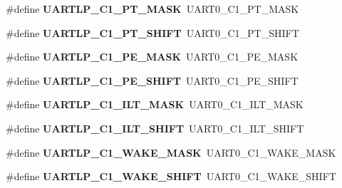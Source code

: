 \begin{DoxyCompactItemize}
\#define {\bfseries U\+A\+R\+T\+L\+P\+\_\+\+C1\+\_\+\+P\+T\+\_\+\+M\+A\+SK}~U\+A\+R\+T0\+\_\+\+C1\+\_\+\+P\+T\+\_\+\+M\+A\+SK
\item 
\mbox{\label{group___backward___compatibility___symbols_ga97ce472c10fd61704932180dc3e26d51}} 
\#define {\bfseries U\+A\+R\+T\+L\+P\+\_\+\+C1\+\_\+\+P\+T\+\_\+\+S\+H\+I\+FT}~U\+A\+R\+T0\+\_\+\+C1\+\_\+\+P\+T\+\_\+\+S\+H\+I\+FT
\item 
\mbox{\label{group___backward___compatibility___symbols_ga23f4f361b83573abfc5cfd6f15ef3a89}} 
\#define {\bfseries U\+A\+R\+T\+L\+P\+\_\+\+C1\+\_\+\+P\+E\+\_\+\+M\+A\+SK}~U\+A\+R\+T0\+\_\+\+C1\+\_\+\+P\+E\+\_\+\+M\+A\+SK
\item 
\mbox{\label{group___backward___compatibility___symbols_gacce781ed7eeeb5e51a145dfec1848406}} 
\#define {\bfseries U\+A\+R\+T\+L\+P\+\_\+\+C1\+\_\+\+P\+E\+\_\+\+S\+H\+I\+FT}~U\+A\+R\+T0\+\_\+\+C1\+\_\+\+P\+E\+\_\+\+S\+H\+I\+FT
\item 
\mbox{\label{group___backward___compatibility___symbols_ga0efd0cf26f2b583d1b21cc8cc3f487fe}} 
\#define {\bfseries U\+A\+R\+T\+L\+P\+\_\+\+C1\+\_\+\+I\+L\+T\+\_\+\+M\+A\+SK}~U\+A\+R\+T0\+\_\+\+C1\+\_\+\+I\+L\+T\+\_\+\+M\+A\+SK
\item 
\mbox{\label{group___backward___compatibility___symbols_ga337530c2b176d78ca6c28da4ab325783}} 
\#define {\bfseries U\+A\+R\+T\+L\+P\+\_\+\+C1\+\_\+\+I\+L\+T\+\_\+\+S\+H\+I\+FT}~U\+A\+R\+T0\+\_\+\+C1\+\_\+\+I\+L\+T\+\_\+\+S\+H\+I\+FT
\item 
\mbox{\label{group___backward___compatibility___symbols_ga2e69313a76db1ef757860afafa047a76}} 
\#define {\bfseries U\+A\+R\+T\+L\+P\+\_\+\+C1\+\_\+\+W\+A\+K\+E\+\_\+\+M\+A\+SK}~U\+A\+R\+T0\+\_\+\+C1\+\_\+\+W\+A\+K\+E\+\_\+\+M\+A\+SK
\item 
\mbox{\label{group___backward___compatibility___symbols_ga4ca5a7f2cdef379d91da768a34275930}} 
\#define {\bfseries U\+A\+R\+T\+L\+P\+\_\+\+C1\+\_\+\+W\+A\+K\+E\+\_\+\+S\+H\+I\+FT}~U\+A\+R\+T0\+\_\+\+C1\+\_\+\+W\+A\+K\+E\+\_\+\+S\+H\+I\+FT

\end{DoxyCompactItemize}
